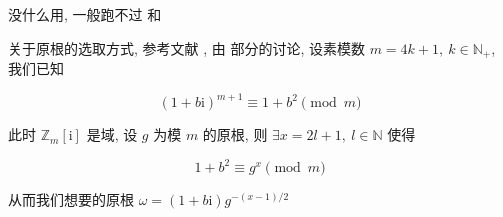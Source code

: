 没什么用, 一般跑不过  和 

关于原根的选取方式, 参考文献 \cite{ieee1451721}, 由  部分的讨论, 设素模数 \(m=4k+1,~k\in\mathbb{N}_+\), 我们已知

\[
    \left(1+b\mathrm{i}\right)^{m+1}\equiv 1+b^2\pmod m
\]

此时 \(\mathbb{Z}_m\left[\mathrm{i}\right]\) 是域, 设 \(g\) 为模 \(m\) 的原根, 则 \(\exists x=2l+1,~l\in\mathbb{N}\) 使得

\[
    1+b^2\equiv g^x\pmod m
\]

从而我们想要的原根 \(\omega=\left(1+b\mathrm{i}\right)g^{-(x-1)/2}\)
